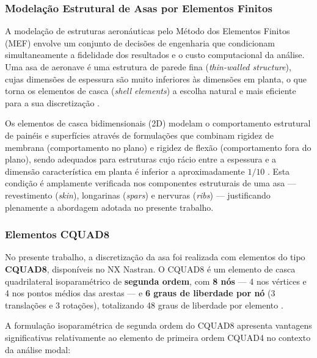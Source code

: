 \documentclass[a4paper,fleqn]{cas-sc}
\begin{document}
\subsubsection{Modelação Estrutural de Asas por Elementos Finitos}

A modelação de estruturas aeronáuticas pelo Método dos Elementos Finitos (MEF) envolve um conjunto de decisões de engenharia que condicionam simultaneamente a fidelidade dos resultados e o custo computacional da análise. Uma asa de aeronave é uma estrutura de parede fina (\textit{thin-walled structure}), cujas dimensões de espessura são muito inferiores às dimensões em planta, o que torna os elementos de casca (\textit{shell elements}) a escolha natural e mais eficiente para a sua discretização \cite{Bathe2014, Cook2001}.

Os elementos de casca bidimensionais (2D) modelam o comportamento estrutural de painéis e superfícies através de formulações que combinam rigidez de membrana (comportamento no plano) e rigidez de flexão (comportamento fora do plano), sendo adequados para estruturas cujo rácio entre a espessura e a dimensão característica em planta é inferior a aproximadamente $1/10$ \cite{Zienkiewicz2005}. Esta condição é amplamente verificada nos componentes estruturais de uma asa --- revestimento (\textit{skin}), longarinas (\textit{spars}) e nervuras (\textit{ribs}) --- justificando plenamente a abordagem adotada no presente trabalho.

\subsubsection{Elementos CQUAD8}

No presente trabalho, a discretização da asa foi realizada com elementos do tipo \textbf{CQUAD8}, disponíveis no NX Nastran. O CQUAD8 é um elemento de casca quadrilateral isoparamétrico de \textbf{segunda ordem}, com \textbf{8 nós} --- 4 nos vértices e 4 nos pontos médios das arestas --- e \textbf{6 graus de liberdade por nó} (3 translações e 3 rotações), totalizando 48 graus de liberdade por elemento \cite{Nastran2014, Cook2001}.

A formulação isoparamétrica de segunda ordem do CQUAD8 apresenta vantagens significativas relativamente ao elemento de primeira ordem CQUAD4 no contexto da análise modal:
\end{document}
